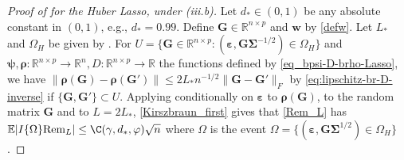\documentclass[11pt]{amsart}
\numberwithin{equation}{section}
\numberwithin{equation}{section}
\def\real{{\mathbb{R}}}
\def\R{{\real}}
\def\E{{\mathbb{E}}}
\def\Rem{\hbox{\rm Rem}}
\def\mathbold{\boldsymbol} %
\def\bG{\mathbold{G}}\def\calG{{\cal G}}\def\scrG{{\mathscr G}}\def\Ghat{\widehat{G}}\def\Gtil{{\widetilde G}}
\def\bw{\mathbold{w}}\def\what{\widehat{w}}\def\wtil{\widetilde{w}}\def\wbar{{\overline w}}
\def\ep{\varepsilon}\def\eps{\epsilon}\def\veps{\varepsilon}
\def\bep{ {\mathbold{\ep} }}
\def\brho{\mathbold{\rho}}\def\rhohat{\widehat{\rho}}\def\hrho{\widehat{\rho}}
\def\bSigma{\mathbold{\Sigma}}\def\hbSigma{{\widehat{\bSigma}}}
\def\bpsi{\mathbold{\psi}}\def\psihat{\widehat{\psi}}\def\hpsi{\widehat{\psi}}
\def\calG{{\cal G}}
\begin{document}
\begin{proof}[Proof of 
    for the Huber Lasso, under (iii.b)]
Let $d_*\in (0,1)$ be any absolute constant in $(0,1)$, e.g., $d_*=0.99$.
Define $\bG\in\R^{n\times p}$ and $\bw$ by
\eqref{defw}.
Let $L_*$ and $\Omega_H$ be given by .
For $U=\{\bG\in\R^{n\times p}: (\bep,\bG\bSigma^{-1/2})\in\Omega_H\}$
and $\bpsi,\brho:\R^{n\times p}\to \R^n,D:\R^{n\times p}\to \R$ the
functions defined by \eqref{eq_bpsi-D-brho-Lasso},
we have $\|\brho(\bG)-\brho(\bG')\|
\le 2L_* n^{-1/2}\|\bG-\bG'\|_F$ by
\eqref{eq:lipschitz-br-D-inverse} if $\{\bG,\bG'\}\subset U$.
Applying 
conditionally on $\bep$ to $\brho(\bG)$, to the random matrix $\bG$ and to $L=2L_*$, 
\eqref{Kirszbraun_first} gives that \eqref{Rem_L}
has $\E|I\{\Omega\}\Rem_L|\le \C(\gamma,d_*,\varphi) \sqrt n$
where $\Omega$ is the event $\Omega=\{(\bep,\bG\bSigma^{1/2})\in\Omega_H\}$.


\end{proof}
\end{document}
